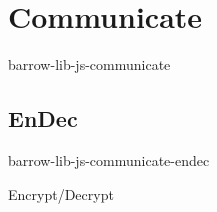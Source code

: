 \section{Communicate}

barrow-lib-js-communicate

\subsection{EnDec}

barrow-lib-js-communicate-endec

Encrypt/Decrypt
